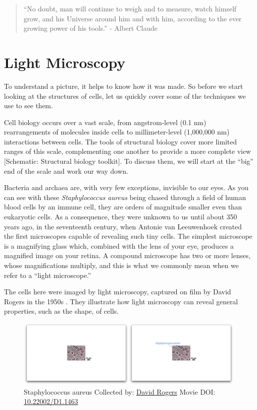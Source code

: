 \documentclass[]{tufte-book}
\begin{document}
\begin{quote}
``No doubt, man will continue to weigh and to measure, watch himself
grow, and his Universe around him and with him, according to the ever
growing power of his tools.'' - Albert Claude \citep{claude1974}
\end{quote}

\section{Light Microscopy}\label{light-microscopy}

To understand a picture, it helps to know how it was made. So before we
start looking at the structures of cells, let us quickly cover some of
the techniques we use to see them.

Cell biology occurs over a vast scale, from angstrom-level (0.1 nm)
rearrangements of molecules inside cells to millimeter-level (1,000,000
nm) interactions between cells. The tools of structural biology cover
more limited ranges of this scale, complementing one another to provide
a more complete view {[}Schematic: Structural biology toolkit{]}. To
discuss them, we will start at the ``big'' end of the scale and work our
way down.

Bacteria and archaea are, with very few exceptions, invisible to our
eyes. As you can see with these \emph{Staphylococcus aureus} being
chased through a field of human blood cells by an immune cell, they are
orders of magnitude smaller even than eukaryotic cells. As a
consequence, they were unknown to us until about 350 years ago, in the
seventeenth century, when Antonie van Leeuwenhoek created the first
microscopes capable of revealing such tiny cells. The simplest
microscope is a magnifying glass which, combined with the lens of your
eye, produces a magnified image on your retina. A compound microscope
has two or more lenses, whose magnifications multiply, and this is what
we commonly mean when we refer to a ``light microscope.''

The cells here were imaged by light microscopy, captured on film by
David Rogers in the 1950s \citep{hill}. They illustrate how light
microscopy can reveal general properties, such as the shape, of cells.





\begin{figure}
\includegraphics{movie_stills/1_1} \caption[Staphylococcus aureus Collected by:
\protect\hyperlink{david_rogers}{David Rogers} Movie DOI:
\href{https://doi.org/10.22002/D1.1463}{10.22002/D1.1463}]{Staphylococcus aureus Collected by:
\protect\hyperlink{david_rogers}{David Rogers} Movie DOI:
\href{https://doi.org/10.22002/D1.1463}{10.22002/D1.1463}}\label{fig:1-1}
\end{figure}
\end{document}

